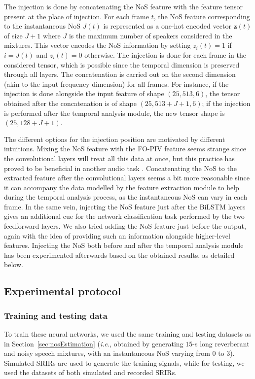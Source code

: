 The injection is done by concatenating the NoS feature with the feature tensor present at the place of injection. For each frame $t$, the NoS feature corresponding to the instantaneous NoS $J(t)$ is represented as a one-hot encoded vector $\mathbf{z}(t)$ of size $J+1$ where $J$ is the maximum number of speakers considered in the mixtures. This vector encodes the NoS information by setting $z_i(t) = 1$ if $i = J(t)$ and $z_i(t) = 0$ otherwise. The injection is done for each frame in the considered tensor, which is possible since the temporal dimension is preserved through all layers. The concatenation is carried out on the second dimension (akin to the input frequency dimension) for all frames. For instance, if the injection is done alongside the input feature of shape $(25, 513, 6)$, the tensor obtained after the concatenation is of shape $(25, 513+J+1, 6)$; if the injection is performed after the temporal analysis module, the new tensor shape is $(25, 128+J+1)$.

The different options for the injection position are motivated by different intuitions. Mixing the NoS feature with the FO-PIV feature seems strange since the convolutional layers will treat all this data at once, but this practice has proved to be beneficial in another audio task \cite{vogl_drum_2017}. Concatenating the NoS to the extracted feature after the convolutional layers seems a bit more reasonable since it can accompany the data modelled by the feature extraction module to help during the temporal analysis process, as the instantaneous NoS can vary in each frame. In the same vein, injecting the NoS feature just after the BiLSTM layers gives an additional cue for the network classification task performed by the two feedforward layers. We also tried adding the NoS feature just before the output, again with the idea of providing such an information alongside higher-level features. Injecting the NoS both before and after the temporal analysis module has been experimented afterwards based on the obtained results, as detailed below.

\subsection{Experimental protocol}
\subsubsection{Training and testing data}

To train these neural networks, we used the same training and testing datasets as in Section~\ref{sec:nosEstimation} (\emph{i.e.}, obtained by generating $15$-s long reverberant and noisy speech mixtures, with an instantaneous NoS varying from $0$ to $3$). Simulated SRIRs are used to generate the training signals, while for testing, we used the datasets of both simulated and recorded SRIRs.

